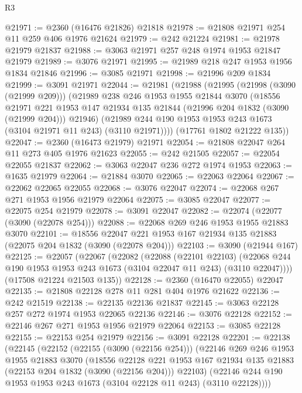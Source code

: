 \begin{lexlean}{R3}
\begin{coremodule}
@21971 := @2360 (@16476 @21826) @21818
@21978 := @21808 @21971 @254 @11 @259 @406 @1976 @21624
@21979 := @242 @21224
@21981 := @21978 @21979 @21837
@21988 := @3063 @21971 @257 @248 @1974 @1953 @21847 @21979
@21989 := @3076 @21971
@21995 := @21989 @218 @247 @1953 @1956 @1834 @21846
@21996 := @3085 @21971
@21998 := @21996 @209 @1834
@21999 := @3091 @21971
@22044 := @21981
    (@21988
      (@21995
        (@21998 (@3090 (@21999 @209)))
        (@21989
          @238
          @246
          @1953
          @1955
          @21844
          @3070
          (@18556
            @21971
            @221
            @1953
            @147
            @21934
            @135
            @21844
            (@21996 @204 @1832 (@3090 (@21999 @204)))
            @21946)
          (@21989 @244 @190 @1953 @1953 @243 @1673 (@3104 @21971 @11 @243) (@3110 @21971))))
      (@17761 @1802 @21222 @135))
@22047 := @2360 (@16473 @21979) @21971
@22054 := @21808 @22047 @264 @11 @273 @405 @1976 @21623
@22055 := @242 @21505
@22057 := @22054 @22055 @21837
@22062 := @3063 @22047 @236 @272 @1974 @1953
@22063 := @1635 @21979
@22064 := @21884 @3070
@22065 := @22063 @22064
@22067 := @22062 @22065 @22055
@22068 := @3076 @22047
@22074 := @22068 @267 @271 @1953 @1956 @21979 @22064
@22075 := @3085 @22047
@22077 := @22075 @254 @21979
@22078 := @3091 @22047
@22082 := @22074 (@22077 (@3090 (@22078 @254)))
@22088 := @22068 @269 @246 @1953 @1955 @21883 @3070
@22101 := @18556 @22047 @221 @1953 @167 @21934 @135 @21883 (@22075 @204 @1832 (@3090 (@22078 @204)))
@22103 := @3090 (@21944 @167)
@22125 := @22057
    (@22067
      (@22082
        (@22088
          (@22101 @22103)
          (@22068 @244 @190 @1953 @1953 @243 @1673 (@3104 @22047 @11 @243) (@3110 @22047))))
      (@17508 @21224 @21503 @135))
@22128 := @2360 (@16470 @22055) @22047
@22135 := @21808 @22128 @278 @11 @281 @404 @1976 @21622
@22136 := @242 @21519
@22138 := @22135 @22136 @21837
@22145 := @3063 @22128 @257 @272 @1974 @1953 @22065 @22136
@22146 := @3076 @22128
@22152 := @22146 @267 @271 @1953 @1956 @21979 @22064
@22153 := @3085 @22128
@22155 := @22153 @254 @21979
@22156 := @3091 @22128
@22201 := @22138
    (@22145
      (@22152
        (@22155 (@3090 (@22156 @254)))
        (@22146
          @269
          @246
          @1953
          @1955
          @21883
          @3070
          (@18556
            @22128
            @221
            @1953
            @167
            @21934
            @135
            @21883
            (@22153 @204 @1832 (@3090 (@22156 @204)))
            @22103)
          (@22146 @244 @190 @1953 @1953 @243 @1673 (@3104 @22128 @11 @243) (@3110 @22128))))

\end{coremodule}
\end{lexlean}
